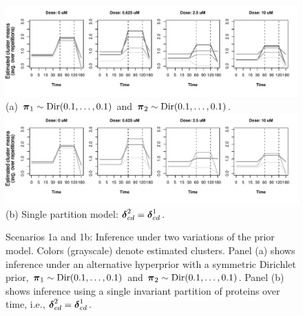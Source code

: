 \begin{figure}[tbp]
  \begin{center}
    \includegraphics[width=.9\textwidth]{figs_biometrics/sim35_1a_gray_biom23.pdf} %
  \\
    (a) $\mbox{\boldmath $\pi$}_1 \sim \mbox{Dir}(0.1, \ldots, 0.1)$ 
    and $\mbox{\boldmath $\pi$}_2 \sim \mbox{Dir}(0.1, \ldots, 0.1)$.\\
    \vspace{1.0cm}
    \includegraphics[width=.9\textwidth]{figs_biometrics/sim35_1b_means_23.pdf}
  \\
    (b) Single partition model: $\mbox{\boldmath $\delta$}^2_{cd}=\mbox{\boldmath $\delta$}^1_{cd}$.
  \end{center}

\caption{Scenarios 1a and 1b: Inference under two variations of the prior
  model. Colors (grayscale) denote estimated clusters.
  Panel (a) shows inference under an alternative hyperprior with a
  symmetric Dirichlet prior, 
  $\mbox{\boldmath $\pi$}_1 \sim \mbox{Dir}(0.1,\ldots, 0.1)$ and
  $\mbox{\boldmath $\pi$}_2 \sim \mbox{Dir}(0.1,\ldots, 0.1)$.
  Panel (b) shows inference 
  using a single invariant partition of proteins over time, i.e.,
  $\mbox{\boldmath $\delta$}^2_{cd}=\mbox{\boldmath $\delta$}^1_{cd}$.}
\label{fig:sc1ab}
\end{figure}

